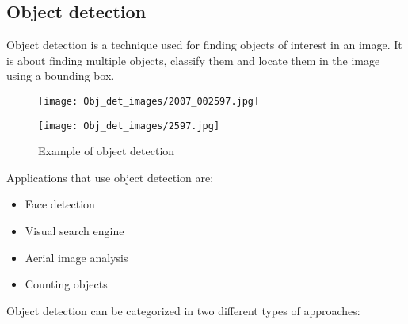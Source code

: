     


\newpage 
\subsection{Object detection} \label{Object Detection}

Object detection is a technique used for finding objects of interest in an image. It is about finding multiple objects, classify them and locate them in the image using a bounding box.  


\begin{figure}[h!]
\begin{multicols}{2}
    \texttt{[image: Obj\_det\_images/2007\_002597.jpg]}\par \texttt{[image: Obj\_det\_images/2597.jpg]}\par
    \end{multicols}
\caption{Example of object detection}
\label{Example_objectdet}
\end{figure}

\par

Applications that use object detection are:

\begin{itemize}
    \item Face detection
    \item Visual search engine
    \item Aerial image analysis
    \item Counting objects
\end{itemize}

\par

Object detection can be categorized in two different types of approaches:


